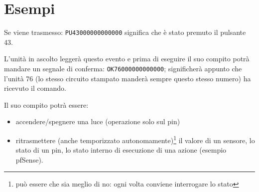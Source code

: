 \documentclass{article}
\begin{document}
    \section*{Esempi}
    
    Se viene trasmesso: \texttt{PU43000000000000} significa che è stato premuto il pulsante 43.
    
    L'unità in ascolto leggerà questo evento e prima di eseguire il suo compito  potrà mandare un segnale di conferma: \texttt{OK76000000000000}; significherà appunto che l'unità 76 (lo stesso circuito stampato manderà sempre questo stesso numero) ha ricevuto il comando.
    
    Il suo compito potrà essere:
    
    \begin{itemize}
        \item accendere/spegnere una luce (operazione solo sul pin)
        \item ritrasmettere (anche temporizzato autonomamente)\footnote{può essere che sia meglio di no: ogni volta conviene interrogare lo stato} il valore di un sensore, lo stato di un pin, lo stato interno di esecuzione di una azione (esempio pfSense).
    \end{itemize}
    
\end{document}
